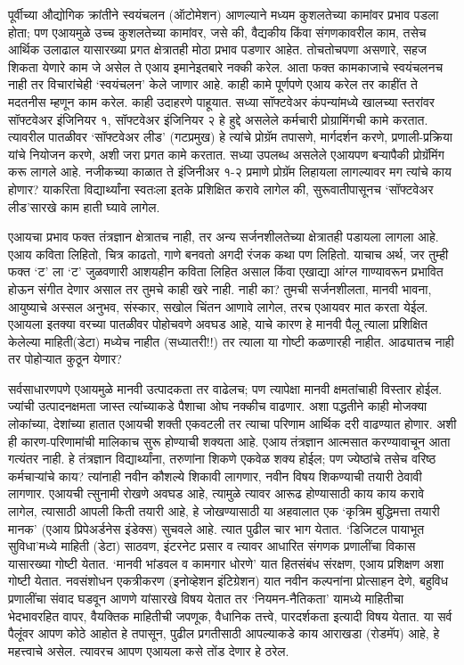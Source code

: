 पूर्वीच्या औद्योगिक क्रांतीने स्वयंचलन (ऑटोमेशन) आणल्याने मध्यम कुशलतेच्या कामांवर प्रभाव पडला होता; पण एआयमुळे उच्च कुशलतेच्या कामांवर, जसे की, वैद्यकीय किंवा संगणकावरील काम, तसेच आर्थिक उलाढाल यासारख्या प्रगत क्षेत्रातही मोठा प्रभाव पडणार आहेत. तोचतोचपणा असणारे, सहज शिकता येणारे काम जे असेल ते एआय इमानेइतबारे नक्की करेल. आता फक्त कामकाजाचे स्वयंचलनच नाही तर विचारांचेही `स्वयंचलन' केले जाणार आहे. काही कामे पूर्णपणे एआय करेल तर काहींत ते मदतनीस म्हणून काम करेल. काही उदाहरणे पाहूयात. सध्या सॉफ्टवेअर कंपन्यांमध्ये खालच्या  स्तरांवर  सॉफ्टवेअर इंजिनियर १, सॉफ्टवेअर इंजिनियर २ हे हुद्दे असलेले कर्मचारी प्रोग्रामिंगची कामे करतात. त्यावरील पातळीवर `सॉफ्टवेअर लीड' (गटप्रमुख) हे त्यांचे प्रोग्रॅम तपासणे, मार्गदर्शन करणे, प्रणाली-प्रक्रिया यांचे नियोजन करणे, अशी जरा प्रगत कामे करतात. सध्या उपलब्ध असलेले एआयपण बऱ्यापैकी प्रोग्रॅमिंग करू लागले आहे. नजीकच्या काळात ते इंजिनीअर १-२ प्रमाणे प्रोग्रॅम लिहायला लागल्यावर मग त्यांचे काय होणार? याकरिता विद्यार्थ्यांना स्वतःला इतके प्रशिक्षित करावे लागेल की, सुरूवातीपासूनच `सॉफ्टवेअर लीड'सारखे काम हाती घ्यावे लागेल.

एआयचा प्रभाव फक्त तंत्रज्ञान क्षेत्रातच नाही, तर अन्य सर्जनशीलतेच्या क्षेत्रातही पडायला लागला आहे. एआय कविता लिहितो, चित्र काढतो, गाणे बनवतो अगदी रंजक कथा पण लिहितो. याचाच अर्थ, जर तुम्ही फक्त `ट' ला `ट' जुळवणारी आशयहीन कविता लिहित असाल किंवा एखाद्या आंग्ल गाण्यावरून प्रभावित होऊन संगीत देणार असाल तर तुमचे काही खरे नाही. नाही का? तुमची सर्जनशीलता, मानवी भावना, आयुष्याचे अस्सल अनुभव, संस्कार, सखोल चिंतन आणावे लागेल, तरच एआयवर मात करता येईल. एआयला इतक्या वरच्या पातळीवर पोहोचवणे अवघड आहे, याचे कारण हे मानवी पैलू त्याला प्रशिक्षित केलेल्या माहिती(डेटा) मध्येच नाहीत (सध्यातरी!!) तर त्याला या गोष्टी कळणारही नाहीत. आढ्यातच नाही तर पोहोऱ्यात कुठून येणार?

सर्वसाधारणपणे एआयमुळे मानवी उत्पादकता तर वाढेलच; पण त्यापेक्षा मानवी क्षमतांचाही विस्तार होईल. ज्यांची उत्पादनक्षमता जास्त त्यांच्याकडे पैशाचा ओघ नक्कीच वाढणार. अशा पद्धतीने काही मोजक्या लोकांच्या, देशांच्या हातात एआयची शक्ती एकवटली तर त्याचा परिणाम आर्थिक दरी वाढण्यात होणार. अशी ही कारण-परिणामांची मालिकाच सुरू होण्याची शक्यता आहे. एआय तंत्रज्ञान आत्मसात करण्यावाचून आता गत्यंतर नाही. हे तंत्रज्ञान विद्यार्थ्यांना, तरुणांना शिकणे एकवेळ शक्य होईल; पण ज्येष्ठांचे तसेच वरिष्ठ कर्मचाऱ्यांचे काय? त्यांनाही नवीन कौशल्ये शिकावी लागणार, नवीन विषय शिकण्याची तयारी ठेवावी लागणार.  एआयची त्सुनामी रोखणे अवघड आहे, त्यामुळे त्यावर आरूढ होण्यासाठी काय काय करावे लागेल, त्यासाठी आपली किती तयारी आहे, हे जोखण्यासाठी या अहवालात एक `कृत्रिम बुद्धिमत्ता तयारी मानक' (एआय प्रिपेअर्डनेस इंडेक्स) सुचवले आहे. त्यात पुढील चार भाग येतात. `डिजिटल पायाभूत सुविधा'मध्ये माहिती (डेटा) साठवण, इंटरनेट प्रसार व त्यावर आधारित संगणक प्रणालींचा विकास यासारख्या गोष्टी येतात. `मानवी भांडवल व कामगार धोरणे' यात हितसंबंध संरक्षण, एआय प्रशिक्षण अशा गोष्टी येतात. नवसंशोधन एकत्रीकरण (इनोव्हेशन इंटिग्रेशन) यात नवीन कल्पनांना प्रोत्साहन देणे, बहुविध प्रणालींचा संवाद घडवून आणणे यांसारखे विषय येतात तर `नियमन-नैतिकता' यामध्ये माहितीचा भेदभावरहित वापर, वैयक्तिक माहितीची जपणूक, वैधानिक तत्त्वे, पारदर्शकता इत्यादी विषय येतात. या सर्व पैलूंवर आपण कोठे आहोत हे तपासून, पुढील प्रगतीसाठी आपल्याकडे काय आराखडा (रोडमॅप) आहे, हे महत्त्वाचे असेल. त्यावरच आपण एआयला कसे तोंड देणार हे ठरेल.

